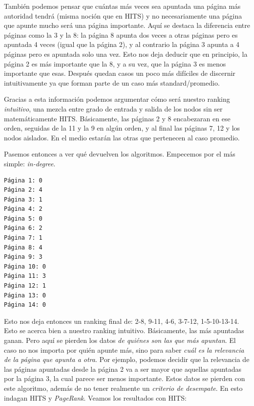 También podemos pensar que cuántas más veces sea apuntada una página más autoridad tendrá (misma noción que en HITS) y no necesariamente una página que apunte mucho será una página importante. Aquí se destaca la diferencia entre páginas como la 3 y la 8: la página 8 apunta dos veces a otras páginas pero es apuntada 4 veces (igual que la página 2), y al contrario la página 3 apunta a 4 páginas pero es apuntada solo una vez. Esto nos deja deducir que en principio, la página 2 es más importante que la 8, y a su vez, que la página 3 es menos importante que esas. Después quedan casos un poco más difíciles de discernir intuitivamente ya que forman parte de un caso más standard/promedio.

Gracias a esta información podemos argumentar cómo será nuestro ranking \textit{intuitivo}, una mezcla entre grado de entrada y salida de los nodos sin ser matemáticamente HITS. Básicamente, las páginas 2 y 8 encabezaran en ese orden, seguidas de la 11 y la 9 en algún orden, y al final las páginas 7, 12 y los nodos aislados. En el medio estarán las otras que pertenecen al caso promedio.

\vspace{\baselineskip}

Pasemos entonces a ver qué devuelven los algoritmos. Empecemos por el más simple: \textit{in-degree}.

\begin{verbatim}
Página 1: 0
Página 2: 4
Página 3: 1
Página 4: 2
Página 5: 0
Página 6: 2
Página 7: 1
Página 8: 4
Página 9: 3
Página 10: 0
Página 11: 3
Página 12: 1
Página 13: 0
Página 14: 0
\end{verbatim}

Esto nos deja entonces un ranking final de: 2-8, 9-11, 4-6, 3-7-12, 1-5-10-13-14. Esto se acerca bien a nuestro ranking intuitivo. Básicamente, las más apuntadas ganan. Pero aquí se pierden los datos \textit{de quiénes son las que más apuntan}. El caso no nos importa por quién apunte más, sino para saber \textit{cuál es la relevancia de la página que apunta a otra}. Por ejemplo, podemos decidir que la relevancia de las páginas apuntadas desde la página 2 va a ser mayor que aquellas apuntadas por la página 3, la cual parece ser menos importante. Estos datos se pierden con este algoritmo, además de no tener realmente un \textit{criterio de desempate}. En esto indagan HITS y \textit{PageRank}. Veamos los resultados con HITS:


